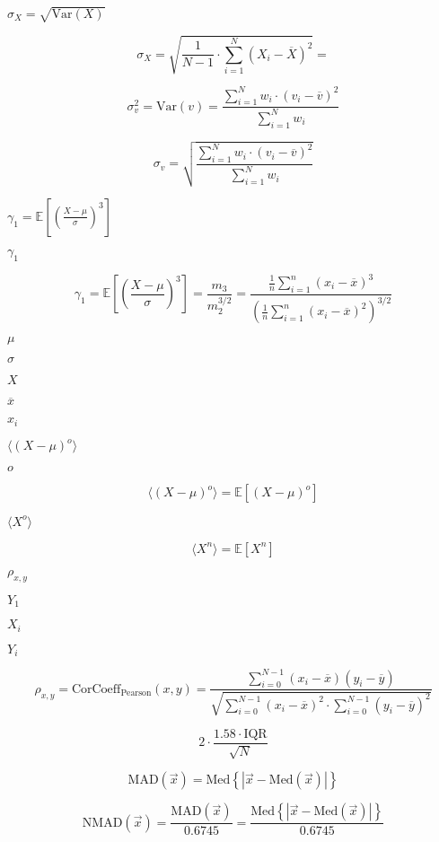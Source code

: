 \documentclass{article}
\begin{document}
$ \sigma_X=\sqrt{\mbox{Var}(X)} $
\pagebreak

\[ \sigma_X=\sqrt{\frac{1}{N-1}\cdot\sum\limits_{i=1}^{N}(X_i-\overline{X})^2}= \]
\pagebreak

\[ \sigma_v^2=\text{Var}(v)=\frac{\sum\limits_{i=1}^{N}w_i\cdot (v_i-\overline{v})^2}{\sum\limits_{i=1}^{N}w_i} \]
\pagebreak

\[ \sigma_v=\sqrt{\frac{\sum\limits_{i=1}^{N}w_i\cdot (v_i-\overline{v})^2}{\sum\limits_{i=1}^{N}w_i}} \]
\pagebreak

$ \gamma_1=\mathbb{E}\left[\left(\frac{X-\mu}{\sigma}\right)^3\right] $
\pagebreak

$ \gamma_1 $
\pagebreak

\[ \gamma_1=\mathbb{E}\left[\left(\frac{X-\mu}{\sigma}\right)^3\right]= \frac{m_3}{m_2^{3/2}} = \frac{\frac{1}{n} \sum_{i=1}^n (x_i-\overline{x})^3}{\left(\frac{1}{n} \sum_{i=1}^n (x_i-\overline{x})^2\right)^{3/2}} \]
\pagebreak

$\mu$
\pagebreak

$\sigma$
\pagebreak

$X$
\pagebreak

$\overline{x}$
\pagebreak

$ x_i$
\pagebreak

$ \langle (X-\mu)^o\rangle $
\pagebreak

$ o $
\pagebreak

\[ \langle (X-\mu)^o\rangle= \mathbb{E}\left[\left(X-\mu\right)^o\right] \]
\pagebreak

$ \langle X^o\rangle $
\pagebreak

\[ \langle X^n\rangle= \mathbb{E}\left[X^n\right] \]
\pagebreak

$ \rho_{x,y} $
\pagebreak

$ Y_1 $
\pagebreak

$ X_i $
\pagebreak

$ Y_i $
\pagebreak

\[ \rho_{x,y}=\text{CorCoeff}_{\text{Pearson}}(x,y)=\frac{\sum\limits_{i=0}^{N-1}(x_i-\overline{x})(y_i-\overline{y})}{\sqrt{\sum\limits_{i=0}^{N-1}(x_i-\overline{x})^2\cdot\sum\limits_{i=0}^{N-1}(y_i-\overline{y})^2}} \]
\pagebreak

\[ 2\cdot\frac{1.58\cdot \mbox{IQR}}{\sqrt{N}} \]
\pagebreak

\[ \mbox{MAD}(\vec{x})=\mbox{Med}\left\{|\vec{x}-\mbox{Med}(\vec{x})|\right\} \]
\pagebreak

\[ \mbox{NMAD}(\vec{x})=\frac{\mbox{MAD}(\vec{x})}{0.6745}=\frac{\mbox{Med}\left\{|\vec{x}-\mbox{Med}(\vec{x})|\right\}}{0.6745} \]
\pagebreak
\end{document}
